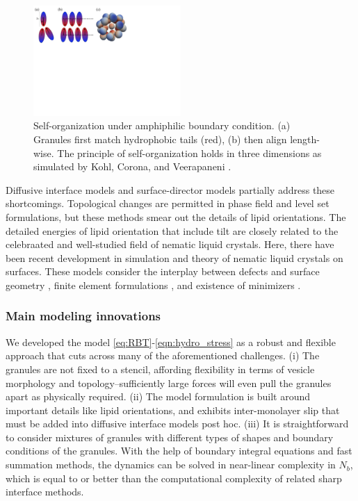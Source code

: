\begin{figure}
  \vspace{-5pt}
\centerline{\includegraphics[width=0.5\textwidth]{figures/SA1Figures/AmphiphilicAssembly.pdf}}
  \vspace{-5pt}
\caption{\label{fig:amphiphilic_assembly}
Self-organization under amphiphilic boundary condition.
(a) Granules first match hydrophobic tails (red),
(b) then align length-wise.
The principle of self-organization holds in three dimensions 
as simulated by Kohl, Corona, and Veerapaneni
\cite{koh-cor-che-vee2021}.}
\end{figure}
Diffusive interface models and surface-director models partially address 
these shortcomings. 
Topological changes are permitted in phase field and level set formulations,
but these methods smear out the details of lipid orientations.
The detailed energies of lipid orientation that include tilt are
closely related to the celebraated and well-studied
field of nematic liquid crystals.  Here, there have been recent development
in simulation and theory of nematic liquid crystals on surfaces.
These models consider the interplay between defects and surface geometry \cite{},
finite element formulations \cite{}, and existence of minimizers \cite{}.

\subsubsection{Main modeling innovations}
We developed the model \eqref{eq:RBT}-\eqref{eqn:hydro_stress} 
as a robust and flexible approach
that cuts across many of the aforementioned challenges.
(i) The granules are not fixed to a stencil, 
affording flexibility in terms of vesicle morphology and topology--sufficiently
large forces will even pull the granules apart as physically required.
(ii) The model formulation is built around important details like lipid orientations,
and exhibits inter-monolayer slip that must be added into diffusive interface models
post hoc. 
(iii) It is straightforward to consider mixtures of granules with different
types of shapes and boundary conditions of the granules.
With the help of boundary integral equations
and fast summation methods, the dynamics can be solved in 
near-linear complexity in $N_b$, which is equal to or better than 
the computational complexity of related sharp interface methods. 

